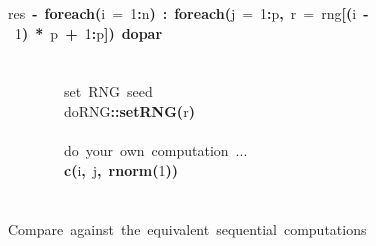 \documentclass[a4paper,12pt]{article}\usepackage{graphicx, color}
\makeatletter
\newcommand{\hlnumber}[1]{\textcolor[rgb]{0,0,0}{#1}}%
\newcommand{\hlfunctioncall}[1]{\textcolor[rgb]{0.501960784313725,0,0.329411764705882}{\textbf{#1}}}%
\newcommand{\hlkeyword}[1]{\textcolor[rgb]{0,0,0}{\textbf{#1}}}%
\newcommand{\hlargument}[1]{\textcolor[rgb]{0.690196078431373,0.250980392156863,0.0196078431372549}{#1}}%
\newcommand{\hlcomment}[1]{\textcolor[rgb]{0.180392156862745,0.6,0.341176470588235}{#1}}%
\newcommand{\hlassignement}[1]{\textcolor[rgb]{0,0,0}{\textbf{#1}}}%
\newcommand{\hlpackage}[1]{\textcolor[rgb]{0.588235294117647,0.709803921568627,0.145098039215686}{#1}}%
\newcommand{\hlsymbol}[1]{\textcolor[rgb]{0,0,0}{#1}}%
\newcommand{\hlstd}[1]{\textcolor[rgb]{0,0,0}{#1}}%
\newenvironment{kframe}{%
 \def\FrameCommand##1{\hskip\@totalleftmargin \hskip-\fboxsep
 \colorbox{shadecolor}{##1}\hskip-\fboxsep
     \hskip-\linewidth \hskip-\@totalleftmargin \hskip\columnwidth}%
 \MakeFramed {\advance\hsize-\width
   \@totalleftmargin\z@ \linewidth\hsize
   \@setminipage}}%
 {\par\unskip\endMakeFramed}
\newenvironment{knitrout}{}{} %
\renewenvironment{knitrout}{\begin{footnotesize}}{\end{footnotesize}}
\makeatother
\begin{document}
\begin{knitrout}
\begin{kframe}
\begin{flushleft}
\hlstd{}\hlsymbol{res}{\ }\hlassignement{\usebox{\hlnormalsizeboxlessthan}-}{\ }\hlfunctioncall{foreach}\hlkeyword{(}\hlargument{i}{\ }\hlargument{=}{\ }\hlnumber{1}\hlkeyword{:}\hlsymbol{n}\hlkeyword{)}{\ }\hlkeyword{\usebox{\hlnormalsizeboxpercent}:\usebox{\hlnormalsizeboxpercent}}{\ }\hlfunctioncall{foreach}\hlkeyword{(}\hlargument{j}{\ }\hlargument{=}{\ }\hlnumber{1}\hlkeyword{:}\hlsymbol{p}\hlkeyword{,}{\ }\hlargument{r}{\ }\hlargument{=}{\ }\hlsymbol{rng}\hlkeyword{[}\hlkeyword{(}\hlsymbol{i}{\ }\hlkeyword{-}{\ }\hlnumber{1}\hlkeyword{)}{\ }\hlkeyword{*}{\ }\hlsymbol{p}{\ }\hlkeyword{+}{\ }\hlnumber{1}\hlkeyword{:}\hlsymbol{p}\hlkeyword{]}\hlkeyword{)}{\ }\hlkeyword{\usebox{\hlnormalsizeboxpercent}dopar\usebox{\hlnormalsizeboxpercent}}\hspace*{\fill}\\
\hlstd{}{\ }{\ }{\ }{\ }\hlkeyword{\usebox{\hlnormalsizeboxopenbrace}}\hspace*{\fill}\\
\hlstd{}\hspace*{\fill}\\
\hlstd{}{\ }{\ }{\ }{\ }{\ }{\ }{\ }{\ }\hlcomment{\usebox{\hlnormalsizeboxhash}{\ }set{\ }RNG{\ }seed}\hspace*{\fill}\\
\hlstd{}{\ }{\ }{\ }{\ }{\ }{\ }{\ }{\ }\hlpackage{doRNG}\hlkeyword{::}\hlfunctioncall{setRNG}\hlkeyword{(}\hlsymbol{r}\hlkeyword{)}\hspace*{\fill}\\
\hlstd{}\hspace*{\fill}\\
\hlstd{}{\ }{\ }{\ }{\ }{\ }{\ }{\ }{\ }\hlcomment{\usebox{\hlnormalsizeboxhash}{\ }do{\ }your{\ }own{\ }computation{\ }...}\hspace*{\fill}\\
\hlstd{}{\ }{\ }{\ }{\ }{\ }{\ }{\ }{\ }\hlfunctioncall{c}\hlkeyword{(}\hlsymbol{i}\hlkeyword{,}{\ }\hlsymbol{j}\hlkeyword{,}{\ }\hlfunctioncall{rnorm}\hlkeyword{(}\hlnumber{1}\hlkeyword{)}\hlkeyword{)}\hspace*{\fill}\\
\hlstd{}{\ }{\ }{\ }{\ }\hlkeyword{\usebox{\hlnormalsizeboxclosebrace}}\hspace*{\fill}\\
\hlstd{}\hspace*{\fill}\\
\hlstd{}\hlcomment{\usebox{\hlnormalsizeboxhash}{\ }Compare{\ }against{\ }the{\ }equivalent{\ }sequential{\ }computations}\hspace*{\fill}\\

\end{flushleft}
\end{kframe}
\end{knitrout}
\end{document}
